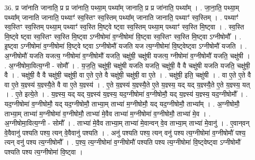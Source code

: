 \documentclass[17pt]{extarticle}
\begin{document}
36. प्र जा॑नाति जानाति॒ प्र प्र जा॑नाति॒ पथ्या॒म् पथ्या᳚म् जानाति॒ प्र प्र जा॑नाति॒ पथ्या᳚म् । . जा॒ना॒ति॒ पथ्या॒म् पथ्या᳚म् जानाति जानाति॒ पथ्याꣳ॑ स्व॒स्तिꣳ स्व॒स्तिम् पथ्या᳚म् जानाति जानाति॒ पथ्याꣳ॑ स्व॒स्तिम् । . पथ्याꣳ॑ स्व॒स्तिꣳ स्व॒स्तिम् पथ्या॒म् पथ्याꣳ॑ स्व॒स्ति मि॒ष्ट्वे ष्ट्वा स्व॒स्तिम् पथ्या॒म् पथ्याꣳ॑ स्व॒स्ति मि॒ष्ट्वा । . स्व॒स्ति मि॒ष्ट्वे ष्ट्वा स्व॒स्तिꣳ स्व॒स्ति मि॒ष्ट्वा ऽग्नीषोमा॑ व॒ग्नीषोमा॑ वि॒ष्ट्वा स्व॒स्तिꣳ स्व॒स्ति मि॒ष्ट्वा ऽग्नीषोमौ᳚ । . इ॒ष्ट्वा ऽग्नीषोमा॑ व॒ग्नीषोमा॑ वि॒ष्ट्वे ष्ट्वा ऽग्नीषोमौ॑ यजति यज त्य॒ग्नीषोमा॑ वि॒ष्ट्वेष्ट्वा ऽग्नीषोमौ॑ यजति । . अ॒ग्नीषोमौ॑ यजति यजत्य॒ ग्नीषोमा॑ व॒ग्नीषोमौ॑ यजति॒ चक्षु॑षी॒ चक्षु॑षी यजत्य॒ ग्नीषोमा॑ व॒ग्नीषोमौ॑ यजति॒ चक्षु॑षी । . अ॒ग्नीषोमा॒वित्य॒ग्नी - सोमौ᳚ । . य॒ज॒ति॒ चक्षु॑षी॒ चक्षु॑षी यजति यजति॒ चक्षु॑षी॒ वै वै चक्षु॑षी यजति यजति॒ चक्षु॑षी॒ वै । . चक्षु॑षी॒ वै वै चक्षु॑षी॒ चक्षु॑षी॒ वा ए॒ते ए॒ते वै चक्षु॑षी॒ चक्षु॑षी॒ वा ए॒ते । . चक्षु॑षी॒ इति॒ चक्षु॑षी । . वा ए॒ते ए॒ते वै वा ए॒ते य॒ज्ञ्स्य॑ य॒ज्ञ्स्यै॒ते वै वा ए॒ते य॒ज्ञ्स्य॑ । . ए॒ते य॒ज्ञ्स्य॑ य॒ज्ञ्स्यै॒ते ए॒ते य॒ज्ञ्स्य॒ यद् यद् य॒ज्ञ्स्यै॒ते ए॒ते य॒ज्ञ्स्य॒ यत् । . ए॒ते इत्ये॒ते । . य॒ज्ञ्स्य॒ यद् यद् य॒ज्ञ्स्य॑ य॒ज्ञ्स्य॒ यद॒ग्नीषोमा॑ व॒ग्नीषोमौ॒ यद् य॒ज्ञ्स्य॑ य॒ज्ञ्स्य॒ यद॒ग्नीषोमौ᳚ । . यद॒ग्नीषोमा॑ व॒ग्नीषोमौ॒ यद् यद॒ग्नीषोमौ॒ ताभ्या॒म् ताभ्या॑ म॒ग्नीषोमौ॒ यद् यद॒ग्नीषोमौ॒ ताभ्या᳚म् । . अ॒ग्नीषोमौ॒ ताभ्या॒म् ताभ्या॑ म॒ग्नीषोमा॑ व॒ग्नीषोमौ॒ ताभ्या॑ मे॒वैव ताभ्या॑ म॒ग्नीषोमा॑ व॒ग्नीषोमौ॒ ताभ्या॑ मे॒व । . अ॒ग्नीषोमा॒वित्य॒ग्नी - सोमौ᳚ । . ताभ्या॑ मे॒वैव ताभ्या॒म् ताभ्या॑ मे॒वान्वन् वे॒व ताभ्या॒म् ताभ्या॑ मे॒वानु॑ । . ए॒वान्‌वन् वे॒वैवानु॑ पश्यति पश्य॒ त्यन् वे॒वैवानु॑ पश्यति । . अनु॑ पश्यति पश्य॒ त्यन् वनु॑ पश्य त्य॒ग्नीषोमा॑ व॒ग्नीषोमौ॑ पश्य॒ त्यन् वनु॑ पश्य त्य॒ग्नीषोमौ᳚ । . प॒श्य॒ त्य॒ग्नीषोमा॑ व॒ग्नीषोमौ॑ पश्यति पश्य त्य॒ग्नीषोमा॑ वि॒ष्ट्वेष्ट्वा ऽग्नीषोमौ॑ पश्यति पश्य त्य॒ग्नीषोमा॑ वि॒ष्ट्वा । \newline
\pagebreak
{}
\end{document}
